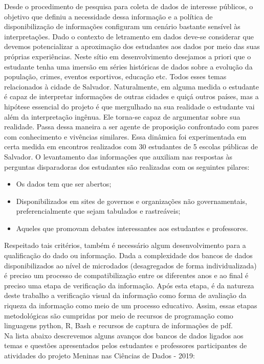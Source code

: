 \documentclass[
]{book}
\providecommand{\tightlist}{%
  \setlength{\itemsep}{0pt}\setlength{\parskip}{0pt}}
\begin{document}
Desde o procedimento de pesquisa para coleta de dados de interesse públicos, o objetivo que definiu a necessidade dessa informação e a política de disponibilização de informações configuram um cenário bastante sensível às interpretações. Dado o contexto de letramento em dados deve-se considerar que devemos potencializar a aproximação dos estudantes aos dados por meio das suas próprias experiências. Neste sítio em desenvolvimento desejamos a priori que o estudante tenha uma imersão em séries históricas de dados sobre a evolução da população, crimes, eventos esportivos, educação etc. Todos esses temas relacionados à cidade de Salvador. Naturalmente, em alguma medida o estudante é capaz de interpretar informações de outras cidades e quiçá outros países, mas a hipótese essencial do projeto é que mergulhado na sua realidade o estudante vai além da interpretação ingênua. Ele torna-se capaz de argumentar sobre sua realidade. Passa dessa maneira a ser agente de proposição confrontado com pares com conhecimento e vivências similares. Essa dinâmica foi experimentada em certa medida em encontros realizados com 30 estudantes de 5 escolas públicas de Salvador.
O levantamento das informações que auxiliam nas respostas às perguntas disparadoras dos estudantes são realizadas com os seguintes pilares:

\begin{itemize}
\tightlist
\item
  Os dados tem que ser abertos;
\item
  Disponibilizados em sites de governos e organizações não governamentais, preferencialmente que sejam tabulados e rastreáveis;\\
\item
  Aqueles que promovam debates interessantes aos estudantes e professores.
\end{itemize}

Respeitado tais critérios, também é necessário algum desenvolvimento para a qualificação do dado ou informação. Dada a complexidade dos bancos de dados disponibilizados ao nível de microdados (desagregados de forma individualizada) é preciso um processo de compatibilização entre os diferentes anos e ao final é preciso uma etapa de verificação da informação. Após esta etapa, é da natureza deste trabalho a verificação visual da informação como forma de avaliação da riqueza da informação como meio de um processo educativo. Assim, essas etapas metodológicas são cumpridas por meio de recursos de programação como linguagens python, R, Bash e recursos de captura de informações de pdf.\\
Na lista abaixo descrevemos alguns avanços dos bancos de dados ligados aos temas e questões apresentados pelos estudantes e professores participantes de atividades do projeto Meninas nas Ciências de Dados - 2019:
\end{document}
